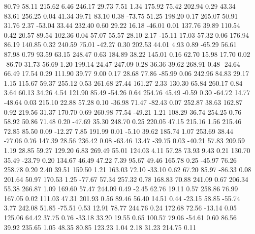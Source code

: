    80.79   58.11  215.62    6.46
  246.17   29.73    7.51    1.34
  175.92   75.42  202.94    0.29
   43.34   83.61  256.25    0.04
   41.34   39.71   83.10    0.38
  -73.75   51.25  198.20    0.17
  265.07   50.91   31.76    2.37
  -53.04   33.44  232.40    0.60
   29.22   16.18  -46.01    0.01
  137.76   39.89  110.54    0.42
   20.57   89.54  102.36    0.04
   57.07   55.57   28.10    2.17
  -15.11   17.03   57.32    0.06
  176.94   86.19  140.85    0.32
  240.59   75.01  -42.27    0.30
  202.53   44.01    4.93    0.89
  -65.29   56.61   87.98    0.79
   93.59   63.15  248.47    0.63
  184.89   38.22  145.01    0.16
   62.70   15.98   17.70    0.02
  -86.70   31.73   56.69    1.20
  199.14   24.47  247.09    0.28
   36.36   39.62  268.91    0.48
  -24.64   66.49   17.54    0.29
  111.90   39.77    9.00    0.17
   28.68   77.86  -85.99    0.06
  242.96   84.83   29.17    1.15
  115.67   59.37  255.12    0.53
  261.68   27.44  161.27    2.33
  130.30   65.84  260.17    0.84
    3.64   60.13   34.26    4.54
  121.90   85.49  -54.26    0.64
  254.76   45.49   -0.59    0.30
  -64.72   14.77  -48.64    0.03
  215.10   22.88   57.28    0.10
  -36.98   71.47  -82.43    0.07
  252.87   38.63  162.87    0.92
  219.56   31.37  170.70    0.69
  260.98   77.54  -49.21    1.21
  108.29   36.74  254.25    0.76
   58.92   50.86   71.48    0.20
  -47.69   35.30  248.70    0.25
  220.05   47.15  215.16    1.56
  215.46   72.85   85.50    0.09
  -12.27    7.85  191.99    0.01
   -5.10   39.62  185.74    1.07
  253.69   38.44  -77.06    0.76
  147.39   28.56  236.42    0.08
  -63.46   13.47  -39.75    0.03
  -40.21   57.83  209.59    1.19
   28.85   59.27  129.20    6.83
  269.49   55.01  124.03    4.11
   57.28   73.93    9.43    0.21
  130.70   35.49  -23.79    0.20
  134.67   46.49   47.22    7.39
   95.67   49.46  165.78    0.25
  -45.97   76.26  258.78    0.20
    2.40   39.51  159.50    1.21
  163.03   72.10  -33.10    0.62
   67.20   85.97  -86.33    0.08
  201.64   50.97  170.53    1.25
  -77.67   57.34  257.32    0.78
  168.83   70.88  241.09    0.67
  206.34   55.38  266.87    1.09
  169.60   57.47  244.09    0.49
   -2.45   62.76   19.11    0.57
  258.86   76.99  167.05    0.02
  111.03   47.31  201.93    0.56
   89.46   56.40   14.51    0.44
  -23.15   58.85  -55.74    3.77
  242.08   51.85  -75.51    0.53
   12.91   78.77  244.76    0.24
  172.68   72.56  -13.14    0.05
  125.06   64.42   37.75    0.76
  -33.18   33.20   19.55    0.65
  100.57   79.06  -54.61    0.60
   86.56   39.92  235.65    1.05
   48.35   80.85  123.23    1.04
    2.18   31.23  214.75    0.11
